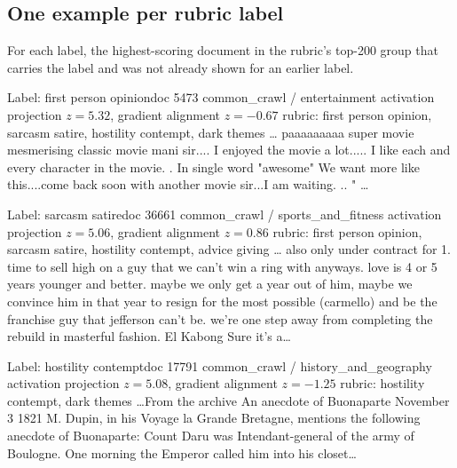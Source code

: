 \subsection{One example per rubric label}\label{app:perlabel}
For each label, the highest-scoring document in the rubric's top-200 group that carries the label and was not already shown for an earlier label.

\begin{docbox}{Label: first person opinion}{doc 5473 \textbullet{} common\_crawl / entertainment \textbullet{} activation projection $z=5.32$, gradient alignment $z=-0.67$ \textbullet{} rubric: first person opinion, sarcasm satire, hostility contempt, dark themes}
\ldots{} paaaaaaaaa  super movie  mesmerising classic movie mani sir....  I enjoyed the movie a lot..... I like each and every character in the movie. . In single word "awesome" We want more like this....come back soon with another movie sir...I am waiting. ..   \nonlatin{} \nonlatin{} " \nonlatin{} \nonlatin{}\ldots{}
\end{docbox}

\begin{docbox}{Label: sarcasm satire}{doc 36661 \textbullet{} common\_crawl / sports\_and\_fitness \textbullet{} activation projection $z=5.06$, gradient alignment $z=0.86$ \textbullet{} rubric: first person opinion, sarcasm satire, hostility contempt, advice giving}
\ldots{} also only under contract for 1. time to sell high on a guy that we can't win a ring with anyways. love is 4 or 5 years younger and better. maybe we only get a year out of him, maybe we convince him in that year to resign for the most possible (carmello) and be the franchise guy that jefferson can't be.  we're one step away from completing the rebuild in masterful fashion.  El Kabong  Sure it's a\ldots{}
\end{docbox}

\begin{docbox}{Label: hostility contempt}{doc 17791 \textbullet{} common\_crawl / history\_and\_geography \textbullet{} activation projection $z=5.08$, gradient alignment $z=-1.25$ \textbullet{} rubric: hostility contempt, dark themes}
\ldots{}From the archive  An anecdote of Buonaparte  November 3 1821  M. Dupin, in his Voyage la Grande Bretagne, mentions the following anecdote of Buonaparte:  Count Daru was Intendant-general of the army of Boulogne. One morning the Emperor called him into his closet\ldots{}
\end{docbox}

